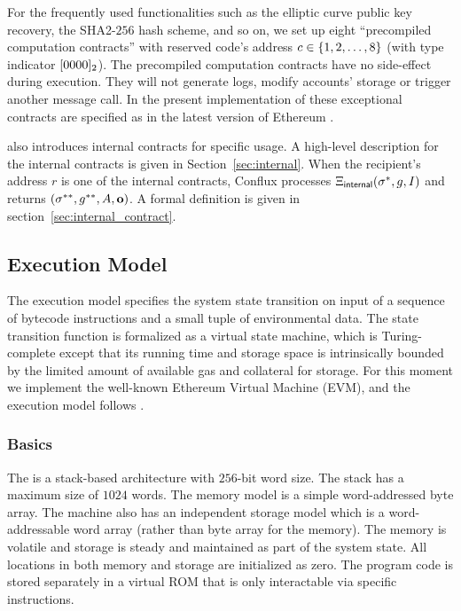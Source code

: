 For the frequently used functionalities such as the elliptic curve public key recovery, the SHA2-$256$ hash scheme, and so on, we set up eight ``precompiled computation contracts'' with reserved code's address $c\in{\left \{{1,2,\dots,8} \right \}}$ (with type indicator $[0000]_2$). The precompiled computation contracts have no side-effect during execution. They will not generate logs, modify accounts' storage or trigger another message call. 
%
In the present implementation of \name these exceptional contracts are specified as in the latest version of Ethereum \cite{ETH_yellow}.

\name also introduces internal contracts for specific usage. A high-level description for the internal contracts is given in Section~\ref{sec:internal}. When the recipient's address $r$ is one of the internal contracts, Conflux processes $\mathrm{\Xi}_{\sf internal}(\mathbf{\sigma}^*,g,I)$ and returns $\left(\mathbf{\sigma}^{**}, g^{**},  A, \mathbf{o} \right)$. A formal definition is given in section~\ref{sec:internal_contract}. 


\subsection{Execution Model}
\label{sec:exe model}

The execution model specifies the system state transition on input of a sequence of bytecode instructions and a small tuple of environmental data. 
The state transition function is formalized as a virtual state machine,
which 
is Turing-complete except that its running time and storage space is intrinsically bounded by the limited amount of available gas and collateral for storage.
% 
For this moment we implement the well-known Ethereum Virtual Machine (EVM), and the execution model follows \cite{ETH_yellow}.


\subsubsection{Basics}

The \cvm is a stack-based architecture with $256$-bit word size.
The stack has a maximum size of $1024$ words.
The memory model is a simple word-addressed byte array.  
The machine also has an independent storage model which is a word-addressable word array (rather than byte array for the memory). 
The memory is volatile and storage is steady and maintained as part of the system state. 
All locations in both memory and storage are initialized as zero.
The program code is stored separately in a virtual ROM that is only interactable via specific instructions.


